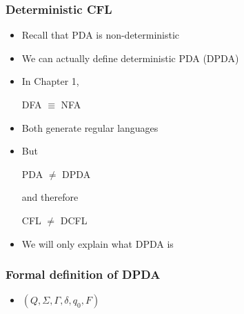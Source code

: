 




\begin{frame}[allowframebreaks] \frametitle{Deterministic CFL}
  \begin{itemize}
  \item Recall that PDA is \alert{non-deterministic}
  \item We can actually define \alert{deterministic} PDA (DPDA)
    
\item In Chapter 1,
  \begin{center}
    DFA $\equiv$ NFA
  \end{center}
\item [] Both generate regular languages
\item But 
  \begin{center}
    PDA $\neq$ DPDA
  \end{center}
and therefore
\begin{center}
  CFL $\neq$ DCFL
\end{center}
\item We will only explain what DPDA is

\end{itemize}\end{frame} \begin{frame}[allowframebreaks] \frametitle{Formal definition of DPDA}
  \begin{itemize}
\item $(Q,\Sigma, \Gamma, \delta, q_0, F)$


\end{itemize}
\end{frame}
